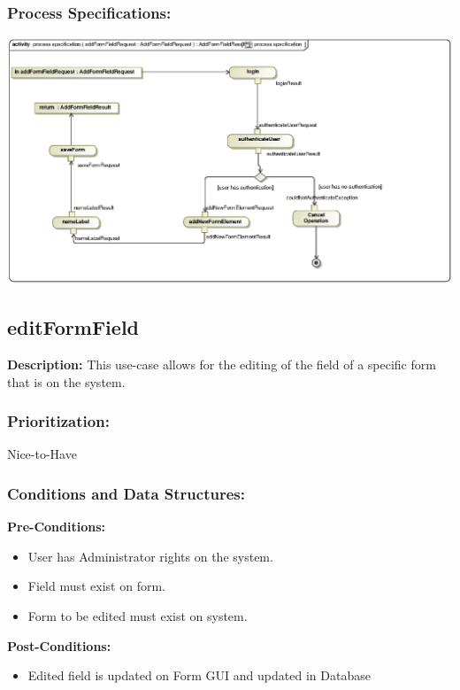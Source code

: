 \subsubsection{Process Specifications:} 
\includegraphics[width=1\linewidth]{./Graphics/FormUseCaseDiagrams/processspecification_AddFormField}






\subsection{editFormField}
\textbf{Description:}
This use-case allows for the editing of the field of a specific form that is on the system.
\subsubsection{Prioritization:}
Nice-to-Have
\subsubsection{Conditions and Data Structures:}
\textbf{Pre-Conditions:}
\begin{itemize}
	\item User has Administrator rights on the system.
	\item Field must exist on form.
	\item Form to be edited must exist on system.
\end{itemize}

\textbf{Post-Conditions:}	
\begin{itemize}
	\item Edited field is updated on Form GUI and updated in Database
\end{itemize}
